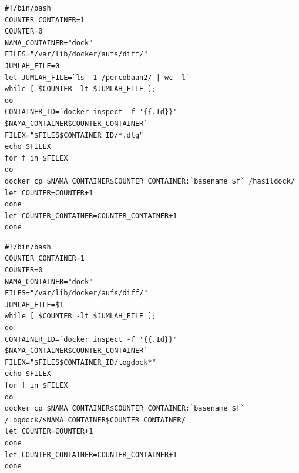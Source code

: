 \begin{lstlisting}[caption=\textit{Script} yang digunakan untuk mengambil hasil dari menjalankan aplikasi Autodock dari masing - masing container]
#!/bin/bash
COUNTER_CONTAINER=1
COUNTER=0
NAMA_CONTAINER="dock"
FILES="/var/lib/docker/aufs/diff/"
JUMLAH_FILE=0
let JUMLAH_FILE=`ls -1 /percobaan2/ | wc -l`
while [ $COUNTER -lt $JUMLAH_FILE ];
do
CONTAINER_ID=`docker inspect -f '{{.Id}}' $NAMA_CONTAINER$COUNTER_CONTAINER`
FILEX="$FILES$CONTAINER_ID/*.dlg"
echo $FILEX
for f in $FILEX
do
docker cp $NAMA_CONTAINER$COUNTER_CONTAINER:`basename $f` /hasildock/
let COUNTER=COUNTER+1
done
let COUNTER_CONTAINER=COUNTER_CONTAINER+1
done

\end{lstlisting}
\begin{lstlisting}[caption=\textit{Script} yang digunakan untuk mengambil log dari masing - masing container]
#!/bin/bash
COUNTER_CONTAINER=1
COUNTER=0
NAMA_CONTAINER="dock"
FILES="/var/lib/docker/aufs/diff/"
JUMLAH_FILE=$1
while [ $COUNTER -lt $JUMLAH_FILE ];
do
CONTAINER_ID=`docker inspect -f '{{.Id}}' $NAMA_CONTAINER$COUNTER_CONTAINER`
FILEX="$FILES$CONTAINER_ID/logdock*"
echo $FILEX
for f in $FILEX
do
docker cp $NAMA_CONTAINER$COUNTER_CONTAINER:`basename $f` /logdock/$NAMA_CONTAINER$COUNTER_CONTAINER/
let COUNTER=COUNTER+1
done
let COUNTER_CONTAINER=COUNTER_CONTAINER+1
done

\end{lstlisting}